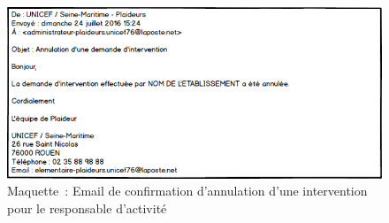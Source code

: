 \begin{figure}[H]
	\centering
	\includegraphics[scale=0.7]{images/maquettes/fonctionnalite4MailConfirmationSuppressionDemandePourAdmin.png}
	\caption{Maquette~: Email de confirmation d'annulation d'une intervention pour le responsable d'activité}

\end{figure}